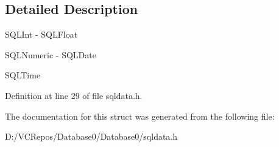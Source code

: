 \subsection{Detailed Description}

\begin{DoxyItemize}
\item S\+Q\+L\+Int -\/ S\+Q\+L\+Float
\item S\+Q\+L\+Numeric -\/ S\+Q\+L\+Date
\item S\+Q\+L\+Time 
\end{DoxyItemize}

Definition at line 29 of file sqldata.\+h.



The documentation for this struct was generated from the following file\+:\begin{DoxyCompactItemize}
\item 
D\+:/\+V\+C\+Repos/\+Database0/\+Database0/sqldata.\+h\end{DoxyCompactItemize}
